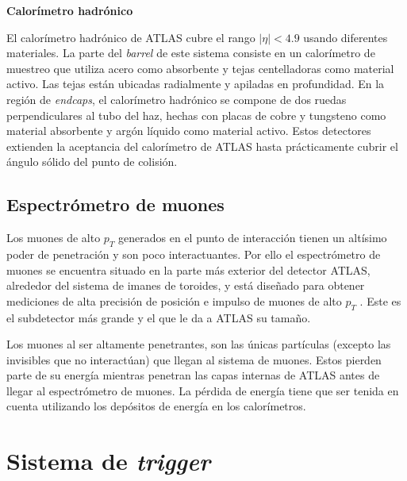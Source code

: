 {\bf Calorímetro hadrónico }

El calorímetro hadrónico de ATLAS cubre el rango $|\eta|< 4.9$ usando diferentes materiales. La parte del \textit{barrel} de este sistema consiste en un calorímetro de muestreo que utiliza acero como absorbente y tejas centelladoras como material activo. Las tejas están ubicadas radialmente y apiladas en profundidad. En la región de \textit{endcaps}, el calorímetro hadrónico se compone de dos ruedas perpendiculares al tubo del haz, hechas con placas de cobre y tungsteno como material absorbente y argón líquido como material activo. Estos detectores extienden la aceptancia del calorímetro de ATLAS hasta prácticamente cubrir el ángulo sólido del punto de colisión.

\subsection{Espectrómetro de muones}

Los muones de alto $p_{T}$ generados en el punto de interacción tienen un altísimo poder de penetración y son poco interactuantes. Por ello el espectrómetro de muones se encuentra situado en la parte más exterior del detector ATLAS, alrededor del sistema de imanes de toroides, y está diseñado para obtener mediciones de alta precisión de posición e impulso de muones de alto $p_{T}$ . Este es el subdetector más grande y el que le da a ATLAS su tamaño. 

Los muones al ser altamente penetrantes, son las únicas partículas (excepto las invisibles que no interactúan) que llegan al sistema de muones. Estos pierden parte de su energía mientras penetran las capas internas de ATLAS antes de llegar al espectrómetro de muones. La pérdida de energía tiene que ser tenida en cuenta utilizando los depósitos de energía en los calorímetros.

\section{Sistema de \textit{trigger}}